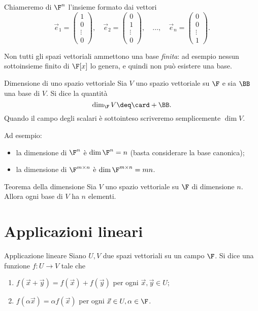 Chiameremo  di $\F^n$ l'insieme formato dai vettori \[
    \vec e_1 = \begin{pmatrix} 1\\0\\\vdots\\0 \end{pmatrix}, \quad
    \vec e_2 = \begin{pmatrix} 0\\1\\\vdots\\0 \end{pmatrix}, \quad
    \dots,                                                    \quad
    \vec e_n = \begin{pmatrix} 0\\0\\\vdots\\1 \end{pmatrix}.
\]

Non tutti gli spazi vettoriali ammettono una base \emph{finita}: ad esempio nessun sottoinsieme finito di $\F[x]$ lo genera, e quindi non può esistere una base. 

\begin{definition}
    {Dimensione di uno spazio vettoriale}{}
    Sia $V$ uno spazio vettoriale su $\F$ e sia $\BB$ una base di $V$. Si dice  la quantità \[
        \dim_{\F} V \deq \card+{\BB}.
    \] Quando il campo degli scalari è sottointeso scriveremo semplicemente $\dim V$.
\end{definition}

Ad esempio: \begin{itemize}
    \item la dimensione di $\F^n$ è $\dim \F^n = n$ (basta considerare la base canonica);
    \item la dimensione di $\Mat{\F, m, n}$ è $\dim \Mat{\F, m, n} = mn$.   
\end{itemize}

\begin{theorem}
    {Teorema della dimensione}{}
    Sia $V$ uno spazio vettoriale su $\F$ di dimensione $n$. Allora ogni base di $V$ ha $n$ elementi.
\end{theorem}

\section{Applicazioni lineari}

\begin{definition}
    {Applicazione lineare}{}
    Siano $U, V$ due spazi vettoriali su un campo $\F$. Si dice  una funzione $f : U \to V$ tale che \begin{enumerate}
        \item $f(\vec x + \vec y) = f(\vec x) + f(\vec y)$ per ogni $\vec x, \vec y \in U$;
        \item $f(\alpha\vec x) = \alpha f(\vec x)$ per ogni $\vec x \in U, \alpha \in \F$.    
    \end{enumerate} 
\end{definition}


